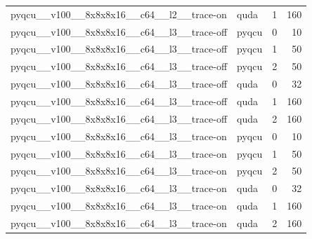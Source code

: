 \begin{table}[htbp]
\begin{tabular}{@{}llrr@{}}
pyqcu\_\_v100\_\_8x8x8x16\_\_c64\_\_l2\_\_trace-on & quda & 1 & 160 \\
pyqcu\_\_v100\_\_8x8x8x16\_\_c64\_\_l3\_\_trace-off & pyqcu & 0 & 10 \\
pyqcu\_\_v100\_\_8x8x8x16\_\_c64\_\_l3\_\_trace-off & pyqcu & 1 & 50 \\
pyqcu\_\_v100\_\_8x8x8x16\_\_c64\_\_l3\_\_trace-off & pyqcu & 2 & 50 \\
pyqcu\_\_v100\_\_8x8x8x16\_\_c64\_\_l3\_\_trace-off & quda & 0 & 32 \\
pyqcu\_\_v100\_\_8x8x8x16\_\_c64\_\_l3\_\_trace-off & quda & 1 & 160 \\
pyqcu\_\_v100\_\_8x8x8x16\_\_c64\_\_l3\_\_trace-off & quda & 2 & 160 \\
pyqcu\_\_v100\_\_8x8x8x16\_\_c64\_\_l3\_\_trace-on & pyqcu & 0 & 10 \\
pyqcu\_\_v100\_\_8x8x8x16\_\_c64\_\_l3\_\_trace-on & pyqcu & 1 & 50 \\
pyqcu\_\_v100\_\_8x8x8x16\_\_c64\_\_l3\_\_trace-on & pyqcu & 2 & 50 \\
pyqcu\_\_v100\_\_8x8x8x16\_\_c64\_\_l3\_\_trace-on & quda & 0 & 32 \\
pyqcu\_\_v100\_\_8x8x8x16\_\_c64\_\_l3\_\_trace-on & quda & 1 & 160 \\
pyqcu\_\_v100\_\_8x8x8x16\_\_c64\_\_l3\_\_trace-on & quda & 2 & 160 \\
\bottomrule
\end{tabular}
\end{table}

